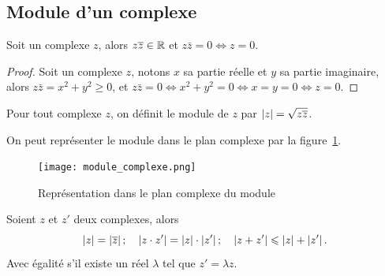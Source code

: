 \subsection{Module d'un complexe}\label{subsec:modulecomplexe}

\begin{prop}
  Soit un complexe \(z\), alors \(z \overline{z} \in{}\mathbb{R}\) et \(z \bar{z} = 0 \iff z
  = 0\).
\end{prop}

\begin{proof}
  Soit un complexe \(z\), notons \(x\) sa partie réelle et \(y\) sa partie
  imaginaire, alors \(z \bar{z} = x^2 + y^2 \geqslant 0\), et \(z \bar{z} = 0
  \iff x^2 + y^2 = 0 \iff x = y = 0 \iff z = 0\).
\end{proof}

\begin{defdef}
  Pour tout complexe \(z\), on définit le module de \(z\) par \(\left\lvert z\right\rvert =
  \sqrt{z \overline{z}}\).
\end{defdef}

On peut représenter le module dans le plan complexe par la
figure~\ref{fig:moduleComplexe}.

\begin{figure}
  \centering
  \texttt{[image: module\_complexe.png]}
  \caption{Représentation dans le plan complexe du module}\label{fig:moduleComplexe}
\end{figure}

\begin{prop}
  Soient \(z\) et \(z'\) deux complexes, alors
  \begin{equation}
    \left\lvert z\right\rvert = \left\lvert\overline{z}\right\rvert; \quad \left\lvert z \cdot z'\right\rvert = \left\lvert z\right\rvert \cdot
    \left\lvert z'\right\rvert; \quad \left\lvert z + z'\right\rvert\leqslant\left\lvert z\right\rvert + \left\lvert z'\right\rvert.
  \end{equation}
  Avec égalité s'il existe un réel \(\lambda\) tel que \(z' = \lambda z\).
\end{prop}

